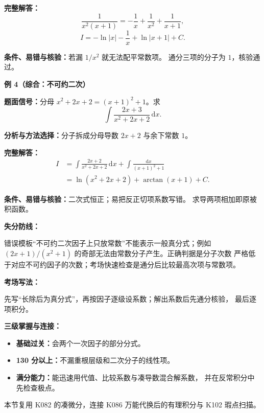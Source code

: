 \begin{knowledgeBox}
\textbf{完整解答：}
\[
\frac1{x^2(x+1)}
=-\frac1x+\frac1{x^2}+\frac1{x+1},
\]
\[
I=-\ln|x|-\frac1x+\ln|x+1|+C.
\]

\textbf{条件、易错与核验：}若漏 \(1/x^2\) 就无法配平常数项。
通分三项的分子为 \(1\)，核验通过。

\textbf{例 4（综合：不可约二次）}

\textbf{题面信号：}分母 \(x^2+2x+2=(x+1)^2+1\)。求
\[
\int\frac{2x+3}{x^2+2x+2}\,\mathrm dx.
\]

\textbf{分析与方法选择：}分子拆成分母导数 \(2x+2\) 与余下常数 \(1\)。

\textbf{完整解答：}
\[
\begin{aligned}
I&=\int\frac{2x+2}{x^2+2x+2}\,\mathrm dx
+\int\frac{\mathrm dx}{(x+1)^2+1}\\
&=\ln(x^2+2x+2)+\arctan(x+1)+C.
\end{aligned}
\]

\textbf{条件、易错与核验：}二次式恒正；易把反正切项系数写错。
求导两项相加即原被积函数。

\textbf{失分防线：}

错误模板“不可约二次因子上只放常数”不能表示一般真分式；例如
\((2x+1)/(x^2+1)\) 的奇部无法由常数分子产生。正确判据是分子次数
严格低于对应不可约因子的次数；考场快速检查是通分后比较最高次项与常数项。

\textbf{考场写法：}

先写“长除后为真分式”，再按因子逐级设系数；解出系数后先通分核验，
最后逐项积分。

\textbf{三级掌握与连接：}
\begin{itemize}
  \item \textbf{基础过关：}会两个一次因子的部分分式。
  \item \textbf{130 分以上：}不漏重根层级和二次分子的线性项。
  \item \textbf{满分能力：}能迅速用代值、比较系数与凑导数混合解系数，
  并在反常积分中先检查极点。
\end{itemize}
本节复用 K082 的凑微分，连接 K086 万能代换后的有理积分与 K102 瑕点扫描。
\end{knowledgeBox}


\par

